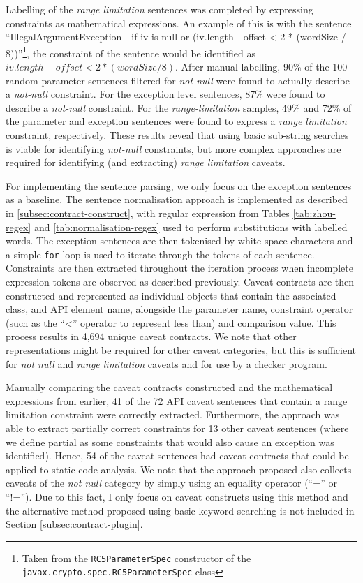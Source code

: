 Labelling of the \textit{range limitation} sentences was completed by expressing constraints as mathematical expressions. An example of this is with the sentence ``IllegalArgumentException - if iv is null or (iv.length - offset < 2 * (wordSize / 8))''\footnote{ Taken from the \lstinline{RC5ParameterSpec} constructor of the \lstinline{javax.crypto.spec.RC5ParameterSpec} class}, the constraint of the sentence would be identified as $iv.length-offset<2*(wordSize/8)$. After manual labelling, 90\% of the 100 random parameter sentences filtered for \textit{not-null} were found to actually describe a \textit{not-null} constraint. For the exception level sentences, 87\% were found to describe a \textit{not-null} constraint. For the \textit{range-limitation} samples, 49\% and 72\% of the parameter and exception sentences were found to express a \textit{range limitation} constraint, respectively. These results reveal that using basic sub-string searches is viable for identifying \textit{not-null} constraints, but more complex approaches are required for identifying (and extracting) \textit{range limitation} caveats. \bigbreak

For implementing the sentence parsing, we only focus on the exception sentences as a baseline. The sentence normalisation approach is implemented as described in \ref{subsec:contract-construct}, with regular expression from Tables \ref{tab:zhou-regex} and \ref{tab:normalisation-regex} used to perform substitutions with labelled words. The exception sentences are then tokenised by white-space characters and a simple \lstinline{for} loop is used to iterate through the tokens of each sentence. Constraints are then extracted throughout the iteration process when incomplete expression tokens are observed as described previously. Caveat contracts are then constructed and represented as individual objects that contain the associated class, and API element name, alongside the parameter name, constraint operator (such as the ``<'' operator to represent less than) and comparison value. This process results in 4,694 unique caveat contracts. We note that other representations might be required for other caveat categories, but this is sufficient for \textit{not null} and \textit{range limitation} caveats and for use by a checker program. \bigbreak

Manually comparing the caveat contracts constructed and the mathematical expressions from earlier, 41 of the 72 API caveat sentences that contain a range limitation constraint were correctly extracted. Furthermore, the approach was able to extract partially correct constraints for 13 other caveat sentences (where we define partial as some constraints that would also cause an exception was identified). Hence, 54 of the caveat sentences had caveat contracts that could be applied to static code analysis. We note that the approach proposed also collects caveats of the \textit{not null} category by simply using an equality operator (``='' or ``!=''). Due to this fact, I only focus on caveat constructs using this method and the alternative method proposed using basic keyword searching is not included in Section \ref{subsec:contract-plugin}. \\

